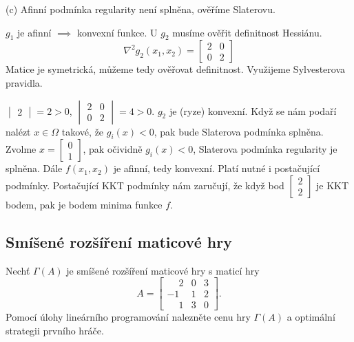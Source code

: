 (c)
Afinní podmínka regularity není splněna, ověříme Slaterovu.

$g_1$ je afinní $\implies$ konvexní funkce. U $g_2$ musíme ověřit definitnost Hessiánu.
\[
    \nabla^2 g_2(x_1, x_2) = 
    \begin{bmatrix}
        2 & 0 \\
        0 & 2
    \end{bmatrix}
\]
Matice je symetrická, můžeme tedy ověřovat definitnost. Využijeme Sylvesterova pravidla.

$\begin{vmatrix}
    2
\end{vmatrix} = 2 > 0$, $
\begin{vmatrix}
    2 & 0 \\
    0 & 2    
\end{vmatrix} = 4 > 0$. $g_2$ je (ryze) konvexní. Když se nám podaří nalézt $x \in \Omega$ takové, že $g_i(x) < 0$, pak 
bude Slaterova podmínka splněna. Zvolme $x = \begin{bmatrix} 0 \\ 1 \end{bmatrix}$, pak očividně $g_i(x) < 0$, Slaterova
podmínka regularity je splněna. Dále $f(x_1, x_2)$ je afinní, tedy konvexní. Platí nutné i postačující podmínky. 
Postačující KKT podmínky nám zaručují, že když bod $\begin{bmatrix}2 \\ 2\end{bmatrix}$ je KKT bodem, pak je bodem 
minima funkce $f$.

\subsection{Smíšené rozšíření maticové hry}
Nechť $\Gamma(A)$ je smíšené rozšíření maticové hry s maticí hry
\[
    A = 
    \begin{bmatrix}
        \phantom{-}2 & 0 & 3 \\
        -1 & 1 & 2 \\
        \phantom{-}1 & 3 & 0
    \end{bmatrix}.
\]
Pomocí úlohy lineárního programování nalezněte cenu hry $\Gamma(A)$ a optimální strategii prvního hráče.
